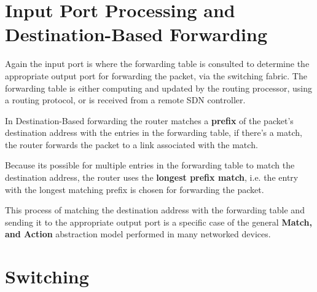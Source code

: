 \documentclass[12pt letter]{report}
\begin{document}
\section{Input Port Processing and Destination-Based Forwarding}

Again the input port is where the forwarding table is consulted to
determine the appropriate output port for forwarding the packet, via
the switching fabric. The forwarding table is either computing and
updated by the routing processor, using a routing protocol, or is
received from a remote SDN controller.


In Destination-Based forwarding the router matches a \textbf{prefix}
of the packet's destination address with the entries in the
forwarding table, if there's a match, the router forwards the packet
to a link associated with the match.

Because its possible for multiple entries in the forwarding table to match the
destination address, the router uses the \textbf{longest prefix
match}, i.e. the entry with the longest matching prefix is chosen for
forwarding the packet.

This process of matching the destination address with the forwarding table
and sending it to the appropriate output port is a specific case of
the general \textbf{Match, and Action} abstraction model performed in
many networked devices.

\section{Switching}

\end{document}
